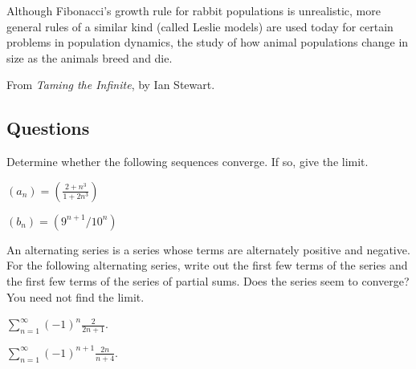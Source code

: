 Although Fibonacci's growth rule for rabbit populations is unrealistic, more general rules of a similar kind (called Leslie models)
are used today for certain problems in population dynamics, the study of how animal populations change in size as the animals breed
and die.
\begin{flushright}
  From \textit{Taming the Infinite}, by Ian Stewart.
\end{flushright}


\subsection*{Questions}
\begin{questions}
  \item Determine whether the following sequences converge. If so, give the limit.
    \begin{parts}
      \item $ (a_n) = \left(\frac{2 + n^3}{1 + 2n^3}\right) $
      \item $ (b_n) = \left(9^{n + 1}/10^n\right) $
    \end{parts}
  \item An alternating series is a series whose terms are alternately positive and negative. For the following alternating series, write
        out the first few terms of the series and the first few terms of the series of partial sums. Does the series seem to converge? You
        need not find the limit.
    \begin{parts}
      \item $ \sum_{n = 1}^\infty (-1)^n \frac{2}{2n + 1} $.
      \item $ \sum_{n = 1}^\infty (-1)^{n + 1} \frac{2n}{n + 4} $.
    \end{parts}
\end{questions}

